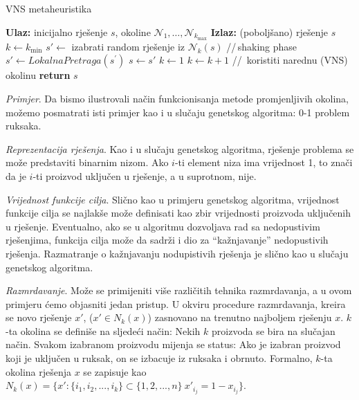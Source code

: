 \documentclass[a4paper, utf8, 11pt, colorlinks]{book}
\begin{document}
    \begin{algorithm}[!t] 
	\caption{VNS metaheuristika}\label{alg:vns}
	\begin{algorithmic}[1]
		\STATE \textbf{Ulaz:} inicijalno rješenje $s$, okoline $\mathcal{N}_1,\ldots, \mathcal{N}_{k_{\max}}$ 
		\STATE \textbf{Izlaz:} (poboljšano) rješenje $s$
		\STATE $k \gets  k_{\min}$
		\STATE  $s' \gets$ izabrati random rješenje iz $\mathcal{N}_k(s)$ \hspace{0.3cm}//\,shaking phase 
		\STATE $s' \gets  LokalnaPretraga(s^{'})$
		\STATE $s \gets s'$
		\STATE $k \gets 1$
		\ELSE 
		\STATE $k \gets k+1$ \hspace{0.3cm}//\, koristiti narednu (VNS) okolinu
		\ENDIF
		\ENDWHILE
		\ENDWHILE
		\STATE \textbf{return} $s$
	\end{algorithmic}
\end{algorithm}


\emph{Primjer}. Da bismo ilustrovali način funkcionisanja metode promjenljivih okolina, možemo posmatrati isti primjer kao i u slučaju genetskog algoritma: 0-1 problem ruksaka. 


\emph{Reprezentacija rješenja}. Kao i u slučaju genetskog algoritma, rješenje problema se može predstaviti binarnim nizom. Ako $i$-ti element niza ima vrijednost 1, to znači da je $i$-ti proizvod uključen u rješenje, a u suprotnom, nije.

\emph{Vrijednost funkcije cilja}. Slično kao u primjeru genetskog algoritma, vrijednost funkcije cilja se najlakše može definisati kao zbir vrijednosti proizvoda uključenih u rješenje. Eventualno, ako se u algoritmu dozvoljava rad sa nedopustivim rješenjima, funkcija cilja može da sadrži i dio za ``kažnjavanje'' nedopustivih rješenja. Razmatranje o kažnjavanju nodupistivih rješenja je slično kao u slučaju genetskog algoritma.

\emph{Razmrdavanje}. Može se primijeniti više različitih tehnika razmrdavanja, a u ovom primjeru ćemo objasniti jedan pristup. 
U okviru procedure razmrdavanja, kreira se novo rješenje $x'$, ($x' \in N_k(x)$) zasno\-vano na trenutno najboljem rješenju  $x$.
$k$-ta okolina se definiše na sljedeći način: Nekih $k$ proizvoda se bira na slučajan način. Svakom izabranom proizvodu mijenja se status: Ako je izabran proizvod koji je uključen u ruksak, on se izbacuje iz ruksaka i obrnuto. Formalno, $k$-ta okolina rješenja
$x$ se zapisuje kao  $N_k(x) = \{x':  \{i_1,i_2,...,i_k\}\subset \{1,2,...,n\}\  x'_{i_j}=1-x_{i_j}\}$.
\end{document}
